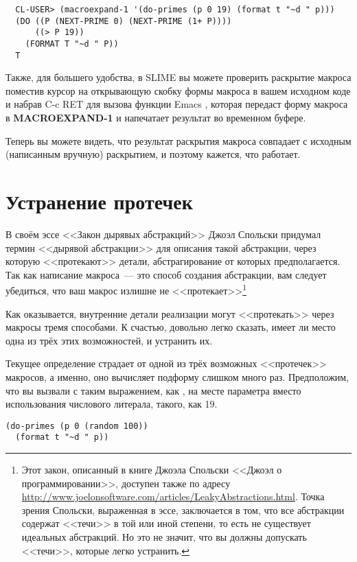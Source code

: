 \begin{verbatim}
  CL-USER> (macroexpand-1 '(do-primes (p 0 19) (format t "~d " p)))
  (DO ((P (NEXT-PRIME 0) (NEXT-PRIME (1+ P))))
      ((> P 19))
    (FORMAT T "~d " P))
  T
\end{verbatim}

Также, для большего удобства, в SLIME вы можете проверить раскрытие макроса поместив
курсор на открывающую скобку формы макроса в вашем исходном коде и набрав C-c RET для
вызова функции Emacs , которая передаст форму макроса в
\textbf{MACROEXPAND-1} и напечатает результат во временном буфере.

Теперь вы можете видеть, что результат раскрытия макроса совпадает с исходным (написанным
вручную) раскрытием, и поэтому кажется, что  работает.

\section{Устранение протечек}

В своём эссе <<Закон дырявых абстракций>> Джоэл Спольски придумал термин <<дырявой
абстракции>> для описания такой абстракции, через которую <<протекают>> детали,
абстрагирование от которых предполагается. Так как написание макроса~--- это способ
создания абстракции, вам следует убедиться, что ваш макрос излишне не
<<протекает>>\footnote{Этот закон, описанный в книге Джоэла Спольски <<Джоэл о
  программировании>>, доступен также по адресу
  \url{http://www.joelonsoftware.com/articles/LeakyAbstractions.html}. Точка зрения
  Спольски, выраженная в эссе, заключается в том, что все абстракции содержат <<течи>> в той
  или иной степени, то есть не существует идеальных абстракций. Но это не значит, что вы
  должны допускать <<течи>>, которые легко устранить.}

Как оказывается, внутренние детали реализации могут <<протекать>> через макросы тремя
способами. К счастью, довольно легко сказать, имеет ли место одна из трёх этих
возможностей, и устранить их.

Текущее определение страдает от одной из трёх возможных <<протечек>> макросов, а именно, оно
вычисляет подформу  слишком много раз. Предположим, что вы вызвали
 с таким выражением, как , на месте параметра
 вместо использования числового литерала, такого, как 19.

\begin{lstlisting}
(do-primes (p 0 (random 100))
  (format t "~d " p))
\end{lstlisting}

